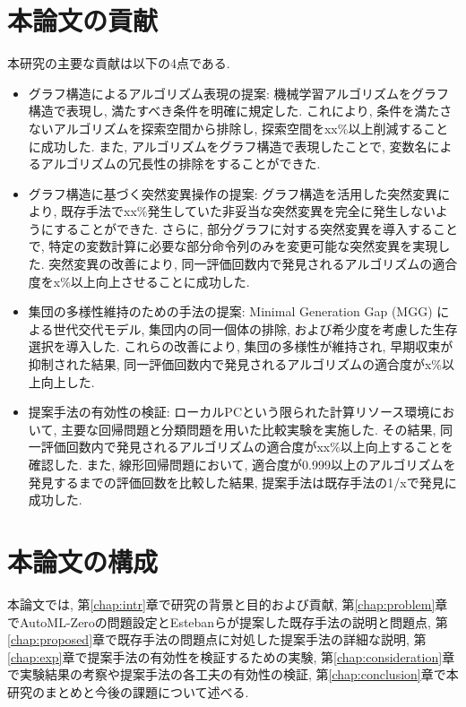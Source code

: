 \documentclass[11pt,oneside,openany,report]{jsbook}
\begin{document}
\section{本論文の貢献}\label{sec:intr:contribution}

本研究の主要な貢献は以下の4点である.

\begin{itemize}
  \item グラフ構造によるアルゴリズム表現の提案: 機械学習アルゴリズムをグラフ構造で表現し, 満たすべき条件を明確に規定した. これにより, 条件を満たさないアルゴリズムを探索空間から排除し, 探索空間をxx\%以上削減することに成功した. また, アルゴリズムをグラフ構造で表現したことで, 変数名によるアルゴリズムの冗長性の排除をすることができた.
  \item グラフ構造に基づく突然変異操作の提案: グラフ構造を活用した突然変異により, 既存手法でxx\%発生していた非妥当な突然変異を完全に発生しないようにすることができた. さらに, 部分グラフに対する突然変異を導入することで, 特定の変数計算に必要な部分命令列のみを変更可能な突然変異を実現した. 突然変異の改善により, 同一評価回数内で発見されるアルゴリズムの適合度をx\%以上向上させることに成功した.
  \item 集団の多様性維持のための手法の提案: Minimal Generation Gap (MGG) による世代交代モデル, 集団内の同一個体の排除, および希少度を考慮した生存選択を導入した. これらの改善により, 集団の多様性が維持され, 早期収束が抑制された結果, 同一評価回数内で発見されるアルゴリズムの適合度がx\%以上向上した.
  \item 提案手法の有効性の検証: ローカルPCという限られた計算リソース環境において, 主要な回帰問題と分類問題を用いた比較実験を実施した. その結果, 同一評価回数内で発見されるアルゴリズムの適合度がxx\%以上向上することを確認した. また, 線形回帰問題において, 適合度が0.999以上のアルゴリズムを発見するまでの評価回数を比較した結果, 提案手法は既存手法の1/xで発見に成功した.
\end{itemize}

\section{本論文の構成}\label{sec:intr:structure}
本論文では, 第\ref{chap:intr}章で研究の背景と目的および貢献, 第\ref{chap:problem}章でAutoML-Zeroの問題設定とEstebanらが提案した既存手法の説明と問題点, 第\ref{chap:proposed}章で既存手法の問題点に対処した提案手法の詳細な説明, 第\ref{chap:exp}章で提案手法の有効性を検証するための実験, 第\ref{chap:consideration}章で実験結果の考察や提案手法の各工夫の有効性の検証,  第\ref{chap:conclusion}章で本研究のまとめと今後の課題について述べる.
\end{document}
